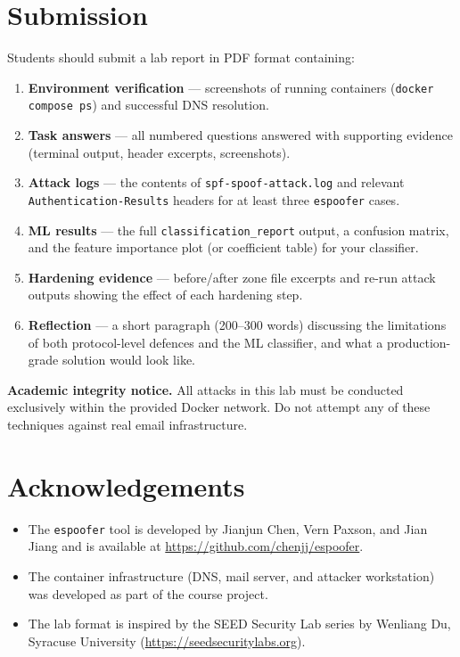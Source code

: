 \documentclass[11pt]{article}
\begin{document}
\section{Submission}

Students should submit a lab report in PDF format containing:

\begin{enumerate}[noitemsep]
  \item \textbf{Environment verification} --- screenshots of running
    containers (\texttt{docker compose ps}) and successful DNS
    resolution.
  \item \textbf{Task answers} --- all numbered questions answered with
    supporting evidence (terminal output, header excerpts, screenshots).
  \item \textbf{Attack logs} --- the contents of
    \texttt{spf-spoof-attack.log} and relevant
    \texttt{Authentication-Results} headers for at least three
    \texttt{espoofer} cases.
  \item \textbf{ML results} --- the full \texttt{classification\_report}
    output, a confusion matrix, and the feature importance plot (or
    coefficient table) for your classifier.
  \item \textbf{Hardening evidence} --- before/after zone file excerpts
    and re-run attack outputs showing the effect of each hardening step.
  \item \textbf{Reflection} --- a short paragraph (200--300 words)
    discussing the limitations of both protocol-level defences and the
    ML classifier, and what a production-grade solution would look like.
\end{enumerate}

\begin{notebox}
\textbf{Academic integrity notice.}
All attacks in this lab must be conducted exclusively within the
provided Docker network.
Do not attempt any of these techniques against real email infrastructure.
\end{notebox}

\section{Acknowledgements}

\begin{itemize}[noitemsep]
  \item The \texttt{espoofer} tool is developed by Jianjun Chen, Vern
    Paxson, and Jian Jiang and is available at
    \url{https://github.com/chenjj/espoofer}.
  \item The container infrastructure (DNS, mail server, and attacker
    workstation) was developed as part of the course project.
  \item The lab format is inspired by the SEED Security Lab series
    by Wenliang Du, Syracuse University
    (\url{https://seedsecuritylabs.org}).
\end{itemize}
\end{document}

